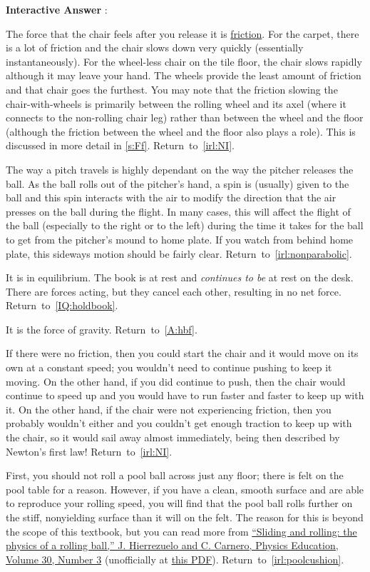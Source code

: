 \documentclass[11pt,letter,openany,makeidx]{book}
\newcommand{\return}[1]{{} \hfill \mbox{Return to \ref{#1}.}}
\newcommand{\autoreturn}[1]{{} \hfill \mbox{Return to \autoref{#1}.}}
\newcounter{AtIQ}
\renewcommand{\theAtIQ}{Answer \arabic{AtIQ}}
\newenvironment{AIQ}{\begin{list}{\textbf{Interactive \theAtIQ}:}{\usecounter{AtIQ} \leftmargin 12pt}}{\end{list}}
\begin{document}
\begin{AIQ}
\item\label{A:chair7} The force that the chair feels after you release it is \hyperref[s:Ff]{friction}.  For the carpet, there is a lot of friction and the chair slows down very quickly (essentially instantaneously).  For the wheel-less chair on the tile floor, the chair slows rapidly although it may leave your hand.  The wheels provide the least amount of friction and that chair goes the furthest.  You may note that the friction slowing the chair-with-wheels is primarily between the rolling wheel and its axel (where it connects to the non-rolling chair leg) rather than between the wheel and the floor (although the friction between the wheel and the floor also plays a role).  This is discussed in more detail in \autoref{s:Ff}. \autoreturn{irl:NI}
\item\label{A:pitches.top} The way a pitch travels is highly dependant on the way the pitcher releases the ball.  As the ball rolls out of the pitcher's hand, a spin is (usually) given to the ball and this spin interacts with the air to modify the direction that the air presses on the ball during the flight.  In many cases, this will affect the flight of the ball (especially to the right or to the left) during the time it takes for the ball to get from the pitcher's mound to home plate.  If you watch from behind home plate, this sideways motion should be fairly clear.  \autoreturn{irl:nonparabolic}
\item\label{A:landedY} It is in equilibrium.  The book is at rest and \textit{continues to be} at rest on the desk. There are forces acting, but they cancel each other, resulting in no net force.  \return{IQ:holdbook}
\item\label{A:gravity}  It is the force of gravity. \return{A:hbf}
\item\label{A:chair8} If there were no friction, then you could start the chair and it would move on its own at a constant speed; you wouldn't need to continue pushing to keep it moving.  On the other hand, if you did continue to push, then the chair would continue to speed up and you would have to run faster and faster to keep up with it. On the other hand, if the chair were not experiencing friction, then you probably wouldn't either and you couldn't get enough traction to keep up with the chair, so it would sail away almost immediately, being then described by Newton's first law! \autoreturn{irl:NI}
\item\label{A:pool.roll} First, you should not roll a pool ball across just any floor; there is felt on the pool table for a reason.  However, if you have a clean, smooth surface and are able to reproduce your rolling speed, you will find that the pool ball rolls further on the stiff, nonyielding surface than it will on the felt.  The reason for this is beyond the scope of this textbook, but you can read more from \href{http://stacks.iop.org/0031-9120/30/i=3/a=009}{``Sliding and rolling: the physics of a rolling ball,'' J. Hierrezuelo and C. Carnero, Physics Education, Volume 30, Number 3} (unofficially at \href{http://billiards.colostate.edu/physics/Hierrezuelo_PhysEd_95_article.pdf}{this PDF}). \autoreturn{irl:poolcushion}

\end{AIQ}
\end{document}
